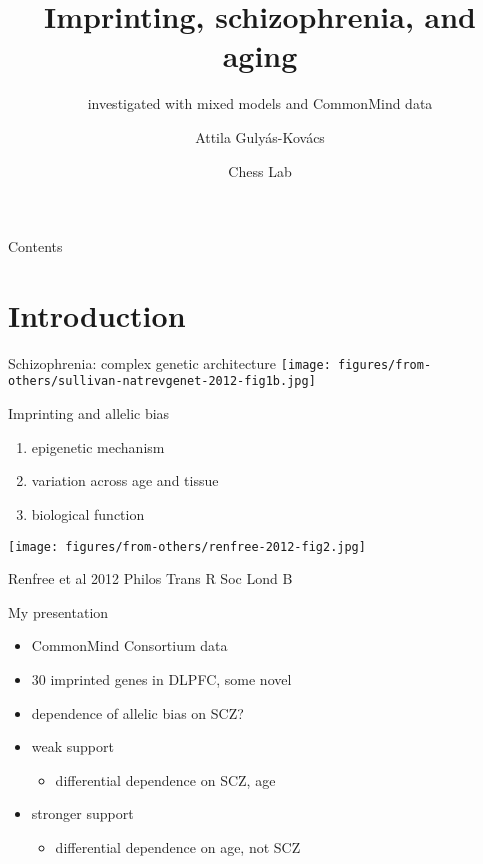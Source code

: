 \documentclass[usenames,dvipsnames]{beamer} %
\title{Imprinting, schizophrenia, and aging}
\subtitle{investigated with mixed models and CommonMind data}
\author{Attila Guly\'{a}s-Kov\'{a}cs}
\date{Chess Lab}
\begin{document}
\begin{frame}[plain, label=title]
\maketitle
\end{frame}

\begin{frame}{Contents}
\tableofcontents
\end{frame}

\section{Introduction}

\begin{frame}{Schizophrenia: complex genetic architecture}
\texttt{[image: figures/from-others/sullivan-natrevgenet-2012-fig1b.jpg]}
\end{frame}

\begin{frame}{Imprinting and allelic bias}
\begin{enumerate}
\item epigenetic mechanism
\item variation across age and tissue
\item biological function 
\end{enumerate}
\texttt{[image: figures/from-others/renfree-2012-fig2.jpg]}

{\tiny Renfree et al 2012 Philos Trans R Soc Lond B}

\end{frame}

\begin{frame}{My   presentation}
\begin{itemize}
\item<1> CommonMind Consortium data
\item<1> 30 imprinted genes in DLPFC, some novel
\item<1> dependence of allelic bias on SCZ? 
\item<1> weak support
\begin{itemize}
\item  differential dependence on SCZ, age
\end{itemize}
\item<2> stronger support
\begin{itemize}
\item  differential dependence on age, \alert{not} SCZ
\end{itemize}
\end{itemize}
\end{frame}
\end{document}
